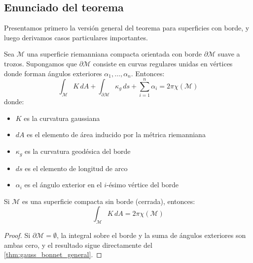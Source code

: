 \subsection{Enunciado del teorema}\label{subsec:gauss_bonnet_enunciado}

Presentamos primero la versión general del teorema para superficies con borde, y luego derivamos casos particulares importantes.

\begin{theorem}\label{thm:gauss_bonnet_general}
Sea $\mathcal{M}$ una superficie riemanniana compacta orientada con borde $\partial \mathcal{M}$ suave a trozos. Supongamos que $\partial \mathcal{M}$ consiste en curvas regulares unidas en vértices donde forman ángulos exteriores $\alpha_1, \ldots, \alpha_n$. Entonces:
\begin{equation}\label{eq:gauss_bonnet_general}
\int_{\mathcal{M}} K \, dA + \int_{\partial \mathcal{M}} \kappa_g \, ds + \sum_{i=1}^n \alpha_i = 2\pi \chi(\mathcal{M})
\end{equation}
donde:
\begin{itemize}
    \item $K$ es la curvatura gaussiana
    \item $dA$ es el elemento de área inducido por la métrica riemanniana
    \item $\kappa_g$ es la curvatura geodésica del borde
    \item $ds$ es el elemento de longitud de arco
    \item $\alpha_i$ es el ángulo exterior en el $i$-ésimo vértice del borde
\end{itemize}
\end{theorem}

\begin{corollary}\label{cor:gauss_bonnet_cerradas}
Si $\mathcal{M}$ es una superficie compacta sin borde (cerrada), entonces:
\begin{equation}\label{eq:gauss_bonnet_cerradas}
\int_{\mathcal{M}} K \, dA = 2\pi \chi(\mathcal{M})
\end{equation}
\end{corollary}

\begin{proof}
Si $\partial \mathcal{M} = \emptyset$, la integral sobre el borde y la suma de ángulos exteriores son ambas cero, y el resultado sigue directamente del \autoref{thm:gauss_bonnet_general}.
\end{proof}

